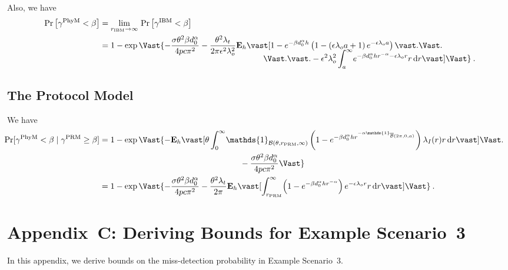 \documentclass[12pt, draftclsnofoot, onecolumn]{IEEEtran}
\begin{document}
Also, we have
\begin{align}\label{eq: PhyM-New1-1}
\Pr \left[\gamma^{\mathrm{PhyM}} < \beta \right] & = \lim_{r_{\mathrm{IBM}} \to \infty} \, \Pr\left[\gamma^{\mathrm{IBM}} < \beta \right] \nonumber \\
&= 1 - \exp\Vast\{ - \frac{\sigma \theta^2 \beta d_{0}^{\alpha}}{4 pc\pi^2} - \frac{\theta^2 \lambda_t}{2 \pi \epsilon^2 \lambda_{o}^{2}} \mathbf{E}_h \vast[ 1 - e^{- \beta d_{0}^{\alpha} h} \left( 1 - \left( \epsilon \lambda_o a+ 1 \right) e^{-\epsilon \lambda_o a}\right) \vast. \Vast. \nonumber \\[-4mm]
& \hspace{70mm} \Vast. \vast. - \epsilon^2 \lambda_{o}^{2} \int_{a}^{\infty} \! e^{- \beta d_{0}^{\alpha} h r^{-\alpha} -\epsilon\lambda_o r} r \, \mathrm{d}r \vast] \Vast\}  \:.
\end{align}

\subsection{The Protocol Model}
We have
\begin{align}
\hspace{-5mm} \Pr[\gamma^{\mathrm{PhyM}} < \beta \mid \gamma^{\mathrm{PRM}} \geq \beta]  &= 1 - \exp\Vast\{- \mathbf{E}_h \vast[\theta \int_{0}^{\infty} \! \mathds{1}_{\mathcal{B}(\theta,r_{\mathrm{PRM}},\infty)} \left( 1 - e^{- \beta d_{0}^{\alpha} h r^{-\alpha \mathds{1}_{\overline{\mathcal{B}}(2\pi,0,a)}}} \right) \lambda_I(r) r \, \mathrm{d}r \vast] \Vast. \nonumber \\
& \hspace{60mm} - \frac{\sigma \theta^2 \beta d_{0}^{\alpha}}{4 pc\pi^2}  \Vast\} \nonumber \\
& = 1 - \exp\Vast\{- \frac{\sigma \theta^2 \beta d_{0}^{\alpha}}{4 pc\pi^2} - \frac{\theta^2 \lambda_t}{2 \pi }  \mathbf{E}_h \vast[\int_{r_{\mathrm{PRM}}}^{\infty} \! \left( 1 - e^{- \beta d_{0}^{\alpha} h r^{-\alpha}} \right) e^{-\epsilon\lambda_o r} r \, \mathrm{d}r \vast] \Vast\} \:.
\end{align}

\section*{Appendix~C: Deriving Bounds for Example Scenario~3}
\setcounter{subsection}{0}
In this appendix, we derive bounds on the miss-detection probability in Example Scenario~3.
\end{document}
